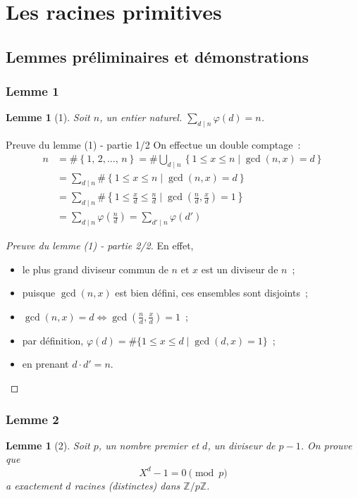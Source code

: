 \documentclass[10pt, mathserif]{beamer}
\newcommand{\Z}{\mathbb Z}
\newtheorem{lem}[thm]{Lemme}
\theoremstyle{definition}
\theoremstyle{remark}
\begin{document}
\section{Les racines primitives}
	\subsection{Lemmes préliminaires et démonstrations}
	\begin{frame}
		\frametitle{Lemme 1}
		\begin{lem}[1]
			Soit $n$, un entier naturel. $\sum_{d \mid n} \varphi(d) = n$.
		\end{lem}

		\begin{block}{Preuve du lemme (1) - partie 1/2}
			On effectue un double comptage~:
			\[\begin{aligned}
			n &= \#\left\{1,\,2,\ldots,\,n\right\} = \#\bigcup_{d\mid n}\left\{1\le x\le n \mid \gcd(n,x)=d\right\} \\
			  &= \sum_{d\mid n}\#\left\{1\le x\le n\mid \gcd(n,x)=d\right\} \\
			  &= \sum_{d\mid n}\#\left\{1\le \frac{x}{d}\le \frac{n}{d}\mid \gcd\left(\frac{n}{d},\frac{x}{d}\right)=1 \right\} \\
			  &= \sum_{d\mid n}\varphi\left(\frac{n}{d}\right) = \sum_{d'\mid n}\varphi(d')
			\end{aligned}\]
		\end{block}
	\end{frame}

	\begin{frame}
		\begin{proof}[Preuve du lemme (1) - partie 2/2]
			En effet,
			\begin{itemize}
				\item le plus grand diviseur commun de $n$ et $x$ est un diviseur de $n$~;
				\item puisque $\gcd(n,x)$ est bien défini, ces ensembles sont disjoints~;
				\item $\gcd(n,x)=d\Longleftrightarrow \gcd\left(\frac{n}{d},\frac{x}{d}\right)=1$~;
				\item par définition, $\varphi(d)=\#\{1\le x\le d\mid \gcd(d,x)=1\}$~;
				\item en prenant $d\cdot d'=n$.
			\end{itemize}
		\end{proof}
	\end{frame}

	\begin{frame}
		\frametitle{Lemme 2}
		\begin{lem}[2]
			Soit $p$, un nombre premier et $d$, un diviseur de $p-1$. On prouve que
			\[X^d - 1 = 0 \pmod p\]
			a exactement $d$ racines (distinctes) dans $\Z/p\Z$.
		\end{lem}
	\end{frame}
\end{document}
